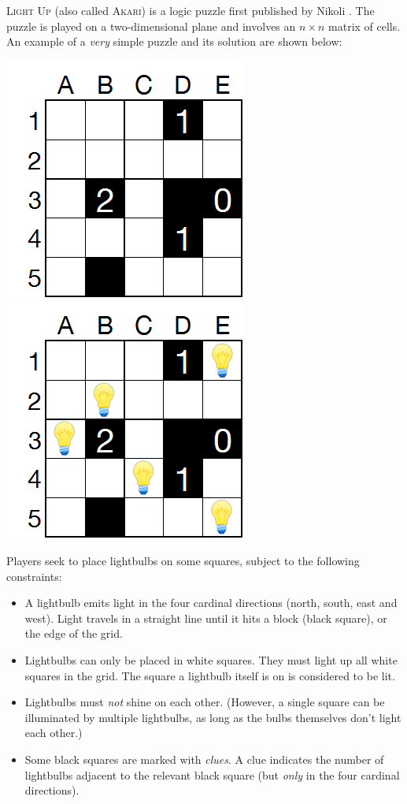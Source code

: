 \documentclass[12pt, a4paper]{article}
\begin{document}
\noindent \textsc{Light Up} (also called \textsc{Akari}) is a logic puzzle first published 
by Nikoli \cite{lightup}. The puzzle is played on a two-dimensional plane and involves an 
$n \times n$ matrix of cells. An example of a \textit{very} simple puzzle and its solution
are shown below:
\begin{center}
\includegraphics[scale=0.7]{lightsout1.png}
\hspace{3cm}
\includegraphics[scale=0.7]{lightsout2.png}
\end{center}

Players seek to place lightbulbs on some squares, subject to the following constraints:
\begin{itemize}
\item A lightbulb emits light in the four cardinal directions (north, south, east
and west). Light travels in a straight line until it hits a block (black square), or
the edge of the grid.
\item Lightbulbs can only be placed in white squares. They must light up all white squares
in the grid. The square a lightbulb itself is on is considered to be lit.
\item Lightbulbs must \textit{not} shine on each other. (However, a single square 
can be illuminated by multiple lightbulbs, as long as the bulbs
themselves don't light each other.)
\item Some black squares are marked with \textit{clues}. A clue indicates the number of
lightbulbs adjacent to the relevant black square (but \textit{only} in the four cardinal
directions).
\end{itemize}
\end{document}
